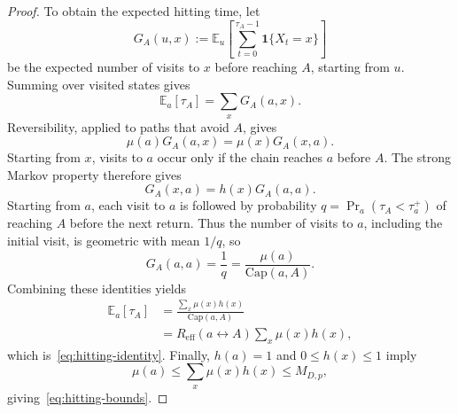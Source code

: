 \documentclass[conference]{IEEEtran}
\newcommand{\E}{\mathbb{E}}
\begin{document}
\begin{proof}
To obtain the expected hitting time, let
\[
G_A(u,x)
:=\E_u\left[\sum_{t=0}^{\tau_A-1}
\mathbf1\{X_t=x\}\right]
\]
be the expected number of visits to $x$ before reaching $A$,
starting from $u$. Summing over visited states gives
\[
\E_a[\tau_A]=\sum_xG_A(a,x).
\]
Reversibility, applied to paths that avoid $A$, gives
\[
\mu(a)G_A(a,x)=\mu(x)G_A(x,a).
\]
Starting from $x$, visits to $a$ occur only if the chain
reaches $a$ before $A$. The strong Markov property therefore
gives
\[
G_A(x,a)=h(x)G_A(a,a).
\]
Starting from $a$, each visit to $a$ is followed by probability
$q=\Pr_a(\tau_A<\tau_a^+)$ of reaching $A$ before the next
return. Thus the number of visits to $a$, including the
initial visit, is geometric with mean $1/q$, so
\[
G_A(a,a)
=\frac{1}{q}
=\frac{\mu(a)}{\mathrm{Cap}(a,A)}.
\]
Combining these identities yields
\[
\begin{aligned}
\E_a[\tau_A]
&=\frac{\sum_x\mu(x)h(x)}{\mathrm{Cap}(a,A)}\\
&=R_{\mathrm{eff}}(a\leftrightarrow A)\sum_x\mu(x)h(x),
\end{aligned}
\]
which is~\eqref{eq:hitting-identity}.
Finally, $h(a)=1$ and $0\le h(x)\le1$ imply
\[
\mu(a)\le\sum_x\mu(x)h(x)\le M_{D,p},
\]
giving~\eqref{eq:hitting-bounds}.
\end{proof}
\end{document}
